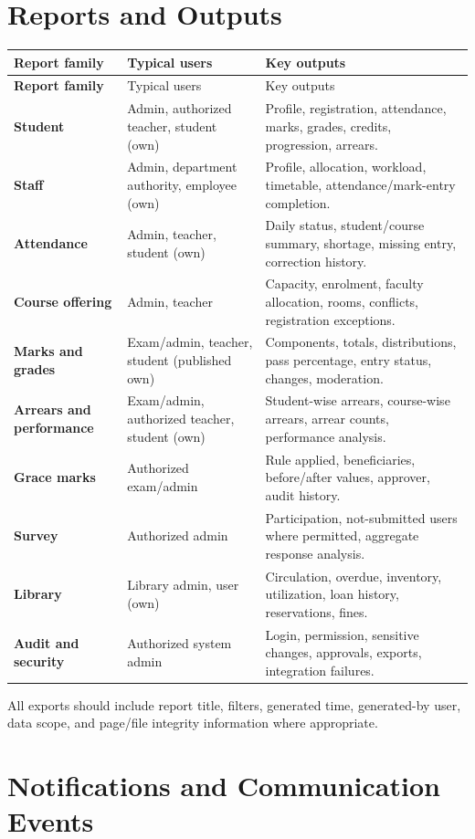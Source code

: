 \documentclass[10pt,a4paper]{article}
\begin{document}
\section{Reports and Outputs}

\begin{longtable}{>{\bfseries}p{3.7cm} p{5.4cm} p{6.8cm}}
\toprule
Report family & Typical users & Key outputs \\
\midrule
\endfirsthead
\toprule
Report family & Typical users & Key outputs \\
\midrule
\endhead
Student & Admin, authorized teacher, student (own) &
Profile, registration, attendance, marks, grades, credits, progression, arrears. \\
Staff & Admin, department authority, employee (own) &
Profile, allocation, workload, timetable, attendance/mark-entry completion. \\
Attendance & Admin, teacher, student (own) &
Daily status, student/course summary, shortage, missing entry, correction history. \\
Course offering & Admin, teacher &
Capacity, enrolment, faculty allocation, rooms, conflicts, registration exceptions. \\
Marks and grades & Exam/admin, teacher, student (published own) &
Components, totals, distributions, pass percentage, entry status, changes, moderation. \\
Arrears and performance & Exam/admin, authorized teacher, student (own) &
Student-wise arrears, course-wise arrears, arrear counts, performance analysis. \\
Grace marks & Authorized exam/admin &
Rule applied, beneficiaries, before/after values, approver, audit history. \\
Survey & Authorized admin &
Participation, not-submitted users where permitted, aggregate response analysis. \\
Library & Library admin, user (own) &
Circulation, overdue, inventory, utilization, loan history, reservations, fines. \\
Audit and security & Authorized system admin &
Login, permission, sensitive changes, approvals, exports, integration failures. \\
\bottomrule
\end{longtable}

All exports should include report title, filters, generated time, generated-by user,
data scope, and page/file integrity information where appropriate.

\section{Notifications and Communication Events}
\end{document}
